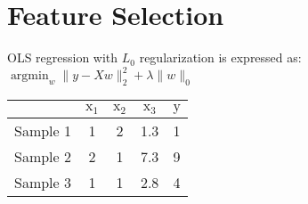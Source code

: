 \section{Feature Selection}
OLS regression with $L_0$ regularization is expressed as: $\operatorname{argmin}_{w}\|y-X w\|_{2}^{2}+\lambda\|w\|_{0}$
	\newline
	\newline
	\begin{table}[h]
		\centering
\begin{tabular}{|c|c|c|c|c|}
	\hline & $\mathrm{x}_{1}$ & $\mathrm{x}_{2}$ & $\mathrm{x}_{3}$ & $\mathrm{y}$ \\
	\hline Sample 1 & 1 & 2 & 1.3 & 1 \\
	\hline Sample 2 & 2 & 1 & 7.3 & 9 \\
	\hline Sample 3 & 1 & 1 & 2.8 & 4 \\
	\hline
\end{tabular}
\end{table}
